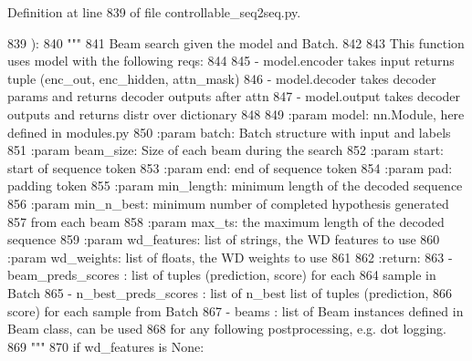 Definition at line 839 of file controllable\+\_\+seq2seq.\+py.


\begin{DoxyCode}
839     ):
840         \textcolor{stringliteral}{"""}
841 \textcolor{stringliteral}{        Beam search given the model and Batch.}
842 \textcolor{stringliteral}{}
843 \textcolor{stringliteral}{        This function uses model with the following reqs:}
844 \textcolor{stringliteral}{}
845 \textcolor{stringliteral}{        - model.encoder takes input returns tuple (enc\_out, enc\_hidden, attn\_mask)}
846 \textcolor{stringliteral}{        - model.decoder takes decoder params and returns decoder outputs after attn}
847 \textcolor{stringliteral}{        - model.output takes decoder outputs and returns distr over dictionary}
848 \textcolor{stringliteral}{}
849 \textcolor{stringliteral}{        :param model: nn.Module, here defined in modules.py}
850 \textcolor{stringliteral}{        :param batch: Batch structure with input and labels}
851 \textcolor{stringliteral}{        :param beam\_size: Size of each beam during the search}
852 \textcolor{stringliteral}{        :param start: start of sequence token}
853 \textcolor{stringliteral}{        :param end: end of sequence token}
854 \textcolor{stringliteral}{        :param pad: padding token}
855 \textcolor{stringliteral}{        :param min\_length: minimum length of the decoded sequence}
856 \textcolor{stringliteral}{        :param min\_n\_best: minimum number of completed hypothesis generated}
857 \textcolor{stringliteral}{            from each beam}
858 \textcolor{stringliteral}{        :param max\_ts: the maximum length of the decoded sequence}
859 \textcolor{stringliteral}{        :param wd\_features: list of strings, the WD features to use}
860 \textcolor{stringliteral}{        :param wd\_weights: list of floats, the WD weights to use}
861 \textcolor{stringliteral}{}
862 \textcolor{stringliteral}{        :return:}
863 \textcolor{stringliteral}{            - beam\_preds\_scores : list of tuples (prediction, score) for each}
864 \textcolor{stringliteral}{              sample in Batch}
865 \textcolor{stringliteral}{            - n\_best\_preds\_scores : list of n\_best list of tuples (prediction,}
866 \textcolor{stringliteral}{              score) for each sample from Batch}
867 \textcolor{stringliteral}{            - beams : list of Beam instances defined in Beam class, can be used}
868 \textcolor{stringliteral}{              for any following postprocessing, e.g. dot logging.}
869 \textcolor{stringliteral}{        """}
870         \textcolor{keywordflow}{if} wd\_features \textcolor{keywordflow}{is} \textcolor{keywordtype}{None}:

\end{DoxyCode}
